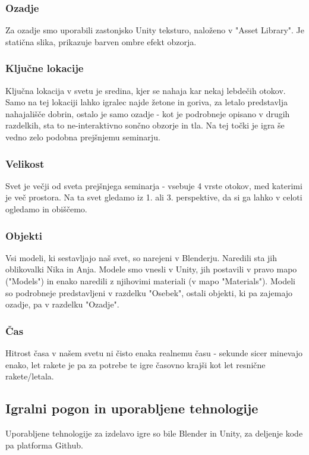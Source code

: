 \documentclass[a4paper]{article}
\begin{document}
\subsubsection{Ozadje}
Za ozadje smo uporabili zastonjsko Unity teksturo, naloženo v "Asset Library". Je statična slika, prikazuje barven ombre efekt obzorja.

\subsubsection{Ključne lokacije}
Ključna lokacija v svetu je sredina, kjer se nahaja kar nekaj lebdečih otokov. Samo na tej lokaciji lahko igralec najde žetone in goriva, za letalo predstavlja nahajališče dobrin, ostalo je samo ozadje - kot je podrobneje opisano v drugih razdelkih, sta to ne-interaktivno sončno obzorje in tla. Na tej točki je igra še vedno zelo podobna prejšnjemu seminarju.

\subsubsection{Velikost}
Svet je večji od sveta prejšnjega seminarja - vsebuje 4 vrste otokov, med katerimi je več prostora. Na ta svet gledamo iz 1. ali 3. perspektive, da si ga lahko v celoti ogledamo in obiščemo. 

\subsubsection{Objekti}
Vsi modeli, ki sestavljajo naš svet, so narejeni v Blenderju. Naredili sta jih oblikovalki Nika in Anja. Modele smo vnesli v Unity, jih postavili v pravo mapo ("Models") in enako naredili z njihovimi materiali (v mapo "Materials"). Modeli so podrobneje predstavljeni v razdelku "Osebek", ostali objekti, ki pa zajemajo ozadje, pa v razdelku "Ozadje". 

\subsubsection{Čas}
Hitrost časa v našem svetu ni čisto enaka realnemu času - sekunde sicer minevajo enako, let rakete je pa za potrebe te igre časovno krajši kot let resnične rakete/letala. 

\subsection{Igralni pogon in uporabljene tehnologije}
Uporabljene tehnologije za izdelavo igre so bile Blender in Unity, za deljenje kode pa platforma Github.
\end{document}

